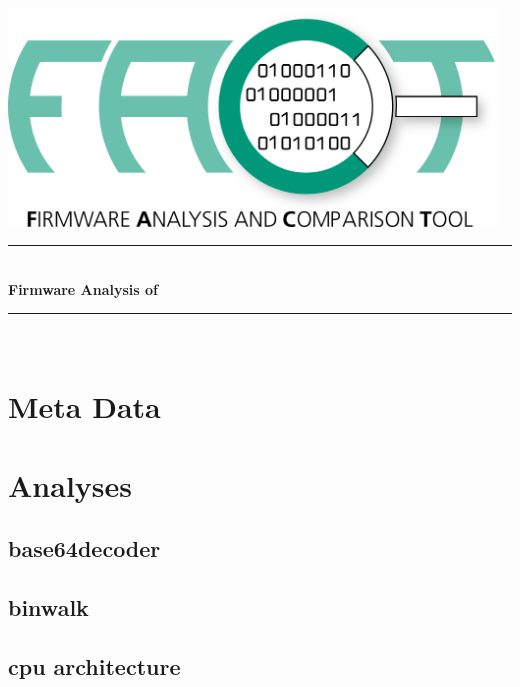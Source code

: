 \documentclass{article}
\begin{document}
\begin{titlepage}

\newcommand{\HRule}{\rule{\linewidth}{0.5mm}}

\center

\includegraphics[width = 13cm]{fact_logo.png}\\[3cm]

\HRule \\[0.4cm]
{\selectfont
{\Large \bfseries Firmware Analysis of }\\[0.4cm]
}
\HRule \\[1.5cm]

\vfill
\end{titlepage}

\section*{Meta Data}
{\selectfont

}

\section*{Analyses}

\subsection*{base64decoder}
{\selectfont

}

\subsection*{binwalk}
{\selectfont

}

\subsection*{cpu architecture}
{\selectfont

}
\end{document}

